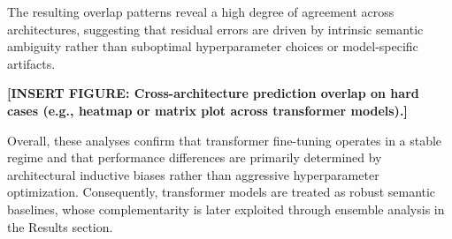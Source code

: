 The resulting overlap patterns reveal a high degree of agreement across
architectures, suggesting that residual errors are driven by intrinsic
semantic ambiguity rather than suboptimal hyperparameter choices or
model-specific artifacts.

\textbf{[INSERT FIGURE: Cross-architecture prediction overlap on hard cases
(e.g., heatmap or matrix plot across transformer models).]}

Overall, these analyses confirm that transformer fine-tuning operates in
a stable regime and that performance differences are primarily determined
by architectural inductive biases rather than aggressive hyperparameter
optimization. Consequently, transformer models are treated as robust
semantic baselines, whose complementarity is later exploited through
ensemble analysis in the Results section.
